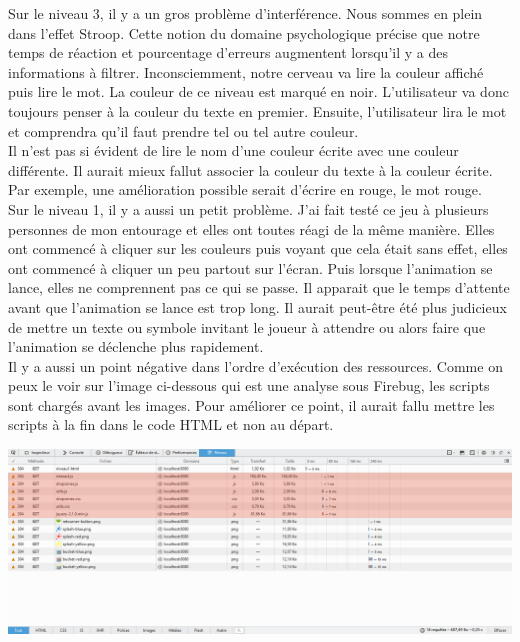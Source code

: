\documentclass{article}
\begin{document}
Sur le niveau 3, il y a un gros problème d'interférence. Nous sommes en plein dans l'effet Stroop. Cette notion du domaine psychologique précise que notre temps de réaction et pourcentage d'erreurs augmentent lorsqu'il y a des informations à filtrer. Inconsciemment, notre cerveau va lire la couleur affiché puis lire le mot. La couleur de ce niveau est marqué en noir. L'utilisateur va donc toujours penser à la couleur du texte en premier. Ensuite, l'utilisateur lira le mot et comprendra qu'il faut prendre tel ou tel autre couleur.
\vspace{0.5cm}\\

Il n'est pas si évident de lire le nom d'une couleur écrite avec une couleur différente. Il aurait mieux fallut associer la couleur du texte à la couleur écrite. Par exemple, une amélioration possible serait d'écrire en rouge, le mot rouge.\\

Sur le niveau 1, il y a aussi un petit problème. J'ai fait testé ce jeu à plusieurs personnes de mon entourage et elles ont toutes réagi de la même manière. Elles ont commencé à cliquer sur les couleurs puis voyant que cela était sans effet, elles ont commencé à cliquer un peu partout sur l'écran. Puis lorsque l'animation se lance, elles ne comprennent pas ce qui se passe. Il apparait que le temps d'attente avant que l'animation se lance est trop long. Il aurait peut-être été plus judicieux de mettre un texte ou symbole invitant le joueur à attendre ou alors faire que l'animation se déclenche plus rapidement.\\

Il y a aussi un point négative dans l'ordre d'exécution des ressources. Comme on peux le voir sur l'image ci-dessous qui est une analyse sous Firebug, les scripts sont chargés avant les images. Pour améliorer ce point, il aurait fallu mettre les scripts à la fin dans le code HTML et non au départ. 

\begin{center}
\vspace{0.5cm}
\includegraphics[width=\textwidth]{7}\\
\end{center}
\end{document}
